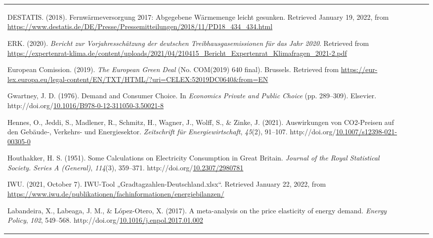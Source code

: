 \documentclass[12pt,twoside]{reedthesis}
\newlength{\cslhangindent}
\newenvironment{CSLReferences}[2] %
 {%
  \setlength{\parindent}{0pt}
  \ifodd #1 \everypar{\setlength{\hangindent}{\cslhangindent}}\ignorespaces\fi
  \ifnum #2 > 0
  \setlength{\parskip}{#2\baselineskip}
  \fi
 }%
 {}
\begin{document}
\begin{tabular}{@{}lllll@{}}
\begin{CSLReferences}{1}{0}
\leavevmode\vadjust pre{\hypertarget{ref-destatis18}{}}%
DESTATIS. (2018). Fernwärmeversorgung 2017: Abgegebene Wärmemenge leicht gesunken. Retrieved January 19, 2022, from \url{https://www.destatis.de/DE/Presse/Pressemitteilungen/2018/11/PD18_434_434.html}

\leavevmode\vadjust pre{\hypertarget{ref-erk20}{}}%
ERK. (2020). \emph{Bericht zur Vorjahresschätzung der deutschen Treibhausgasemissionen für das Jahr 2020}. Retrieved from \url{https://expertenrat-klima.de/content/uploads/2021/04/210415_Bericht_Expertenrat_Klimafragen_2021-2.pdf}

\leavevmode\vadjust pre{\hypertarget{ref-europeancomission19}{}}%
European Comission. (2019). \emph{The European Green Deal} (No. COM(2019) 640 final). Brussels. Retrieved from \url{https://eur-lex.europa.eu/legal-content/EN/TXT/HTML/?uri=CELEX:52019DC0640\&from=EN}

\leavevmode\vadjust pre{\hypertarget{ref-gwartney76}{}}%
Gwartney, J. D. (1976). Demand and Consumer Choice. In \emph{Economics Private and Public Choice} (pp. 289--309). Elsevier. http://doi.org/\href{https://doi.org/10.1016/B978-0-12-311050-3.50021-8}{10.1016/B978-0-12-311050-3.50021-8}

\leavevmode\vadjust pre{\hypertarget{ref-hennes_etal21}{}}%
Hennes, O., Jeddi, S., Madlener, R., Schmitz, H., Wagner, J., Wolff, S., \& Zinke, J. (2021). Auswirkungen von CO2-Preisen auf den Gebäude‑, Verkehrs- und Energiesektor. \emph{Zeitschrift für Energiewirtschaft}, \emph{45}(2), 91--107. http://doi.org/\href{https://doi.org/10.1007/s12398-021-00305-0}{10.1007/s12398-021-00305-0}

\leavevmode\vadjust pre{\hypertarget{ref-houthakker51}{}}%
Houthakker, H. S. (1951). Some Calculations on Electricity Consumption in Great Britain. \emph{Journal of the Royal Statistical Society. Series A (General)}, \emph{114}(3), 359--371. http://doi.org/\href{https://doi.org/10.2307/2980781}{10.2307/2980781}

\leavevmode\vadjust pre{\hypertarget{ref-iwu21}{}}%
IWU. (2021, October 7). IWU-Tool „Gradtagzahlen-Deutschland.xlsx``. Retrieved January 22, 2022, from \url{https://www.iwu.de/publikationen/fachinformationen/energiebilanzen/}

\leavevmode\vadjust pre{\hypertarget{ref-labandeira_etal17}{}}%
Labandeira, X., Labeaga, J. M., \& López-Otero, X. (2017). A meta-analysis on the price elasticity of energy demand. \emph{Energy Policy}, \emph{102}, 549--568. http://doi.org/\href{https://doi.org/10.1016/j.enpol.2017.01.002}{10.1016/j.enpol.2017.01.002}


\end{CSLReferences}
\end{tabular}
\end{document}
